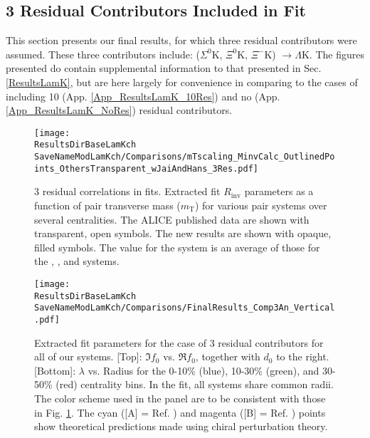 \documentclass[/home/jesse/Analysis/FemtoAnalysis/AnalysisNotes/AnalysisNoteJBuxton.tex]{subfiles}
\renewcommand{\NonFlatBgdLamKch}{_NonFlatBgdCrctnLamK0LinearLamKchPolynomial}
\renewcommand{\ResNum}{_3Res}
\renewcommand{\PrimMaxDecay}{_PrimMaxDecay10fm}
\renewcommand{\SaveNameModLamKch}{\MomRes\NonFlatBgdLamKch\ResNum\PrimMaxDecay\ResMethod\ParamFixAndShareLamKch}
\begin{document}
\subsection{3 Residual Contributors Included in Fit}
\label{App_ResultsLamK_3Res}

This section presents our final results, for which three residual contributors were assumed.
These three contributors include: ($\Sigma^{0}\mathrm{K}$, $\Xi^{0}\mathrm{K}$, $\Xi^{-}\mathrm{K}$) $\rightarrow \Lambda\mathrm{K}$.
The figures presented do contain supplemental information to that presented in Sec. \ref{ResultsLamK}, but are here largely for convenience in comparing to the cases of including 10 (App. \ref{App_ResultsLamK_10Res}) and no (App. \ref{App_ResultsLamK_NoRes}) residual contributors.


\begin{figure}[h]
  \centering
  \texttt{[image: \\ResultsDirBaseLamKch\\SaveNameModLamKch/Comparisons/mTscaling\_MinvCalc\_OutlinedPoints\_OthersTransparent\_wJaiAndHans\_3Res.pdf]}
  \caption[$m_{\mathrm{T}}$ scaling of radii: 3 residuals]
  {
  3 residual correlations in \LamK fits.  
  Extracted fit $R_{\mathrm{inv}}$ parameters as a function of pair transverse mass ($m_{\mathrm{T}}$) for various pair systems over several centralities. 
  The ALICE published data \cite{Adam:2015vja} are shown with transparent, open symbols.  
  The new \LamK results are shown with opaque, filled symbols.  
  The \mt value for the \LamK system is an average of those for the \LamKchP, \ALamKchM, and \LamKs systems.
  }
  \label{figApp:mTScalingOfRadii_3Res}
\end{figure}


\begin{figure}[h]
  \centering
  \texttt{[image: \\ResultsDirBaseLamKch\\SaveNameModLamKch/Comparisons/FinalResults\_Comp3An\_Vertical.pdf]}
  \caption[Extracted scattering parameters: 3 residuals]
  {
  Extracted fit parameters for the case of 3 residual contributors for all of our \LamK systems.  
  [Top]: $\Im f_{0}$ vs. $\Re f_{0}$, together with $d_{0}$ to the right.  
  [Bottom]: $\lambda$ vs. Radius for the 0-10\% (blue), 10-30\% (green), and 30-50\% (red) centrality bins.  
  In the fit, all \LamK systems share common radii.
  The color scheme used in the panel are to be consistent with those in Fig. \ref{figApp:mTScalingOfRadii_3Res}.
  The cyan ([A] = Ref. \cite{Liu:2006xja}) and magenta ([B] = Ref. \cite{Mai:2009ce}) points show theoretical predictions made using chiral perturbation theory.
  }
  \label{figApp:ScattParams_3Res}
\end{figure}
\end{document}
